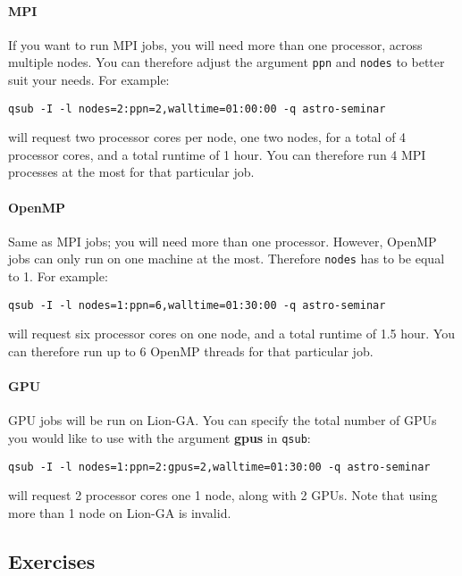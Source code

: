 \documentclass[letterpaper,10pt]{article}
\begin{document}
\paragraph{MPI}
If you want to run MPI jobs, you will need more than one processor, across multiple nodes. You can therefore adjust the argument \texttt{ppn} and \texttt{nodes} to better suit your needs. For example:
\begin{center}
\texttt{qsub -I -l nodes=2:ppn=2,walltime=01:00:00 -q astro-seminar}
\end{center}
will request two processor cores per node, one two nodes, for a total of 4 processor cores, and a total runtime of 1 hour. You can therefore run 4 MPI processes at the most for that particular job.

\paragraph{OpenMP}
Same as MPI jobs; you will need more than one processor. However, OpenMP jobs can only run on one machine at the most. Therefore \texttt{nodes} has to be equal to 1. For example:
\begin{center}
\texttt{qsub -I -l nodes=1:ppn=6,walltime=01:30:00 -q astro-seminar}
\end{center}
will request six processor cores on one node, and a total runtime of 1.5 hour. You can therefore run up to 6 OpenMP threads for that particular job.

\paragraph{GPU}
GPU jobs will be run on Lion-GA. You can specify the total number of GPUs you would like to use with the argument \textbf{gpus} in \texttt{qsub}:
\begin{center}
\texttt{qsub -I -l nodes=1:ppn=2:gpus=2,walltime=01:30:00 -q astro-seminar}
\end{center}
will request 2 processor cores one 1 node, along with 2 GPUs. Note that using more than 1 node on Lion-GA is invalid. 


\subsection{Exercises}
\end{document}
